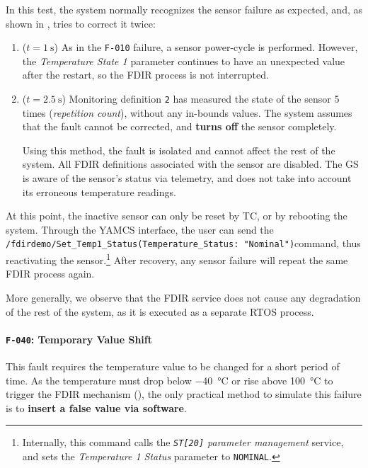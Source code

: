 \documentclass[a4paper,nobib]{tufte-book}
\begin{document}
In this test, the system normally recognizes the sensor failure as expected, and, as shown in , tries to correct it twice:
\begin{enumerate}
	\item (\( t = \SI{1}{\second}\)) As in the \texttt{F-010} failure, a sensor power-cycle is performed. However, the \emph{Temperature State 1} parameter continues to have an unexpected value after the restart, so the \acs{FDIR} process is not interrupted.
\item (\(t = \SI{2.5}{\second}\)) Monitoring definition \texttt{2} has measured the state of the sensor 5 times (\emph{repetition count}), without any in-bounds values. The system assumes that the fault cannot be corrected, and \textbf{turns off} the sensor completely.

Using this method, the fault is isolated and cannot affect the rest of the system. All \acs{FDIR} definitions associated with the sensor are disabled. The \acl{GS} is aware of the sensor's status via telemetry, and does not take into account its erroneous temperature readings.
\end{enumerate}

At this point, the inactive sensor can only be reset by \acs{TC}, or by rebooting the system. Through the \acs{YAMCS} interface, the user can send the \texttt{/fdirdemo/Set_Temp1_Status(Temperature_Status: "Nominal")}\linebreak[4] command, thus reactivating the sensor.\footnote[][-3ex]{Internally, this command calls the \emph{\texttt{ST[20]} parameter management} service, and sets the \emph{Temperature 1 Status} parameter to \texttt{NOMINAL}.} After recovery, any sensor failure will repeat the same \acs{FDIR} process again.

More generally, we observe that the \acs{FDIR} service does not cause any degradation of the rest of the system, as it is executed as a separate \acs{RTOS} process.

\clearpage
\paragraph{\textbf{\texttt{F-040}: Temporary Value Shift}}\hspace{0pt}

This fault requires the temperature value to be changed for a short period of time. As the temperature must drop below \SI{-40}{\celsius} or rise above \SI{100}{\celsius} to trigger the \acs{FDIR} mechanism (), the only practical method to simulate this failure is to \textbf{insert a false value via software}.
\end{document}
